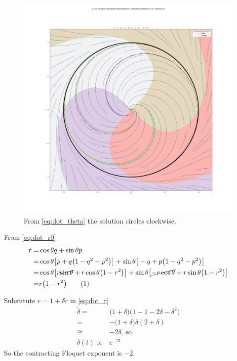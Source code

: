 \documentclass[]{article}
\newcommand\numberthis{\addtocounter{equation}{1}\tag{\theequation}}
\begin{document}
\begin{figure}[H]
	\caption{From \eqref{eq:dot_theta} the solution circles clockwise.}
	\includegraphics[width=\textwidth]{wk2/floquet.png}
\end{figure}
From \eqref{eq:dot_r0}
\begin{align*}
	\dot{r} =&	\cos{\theta} \dot{q} + \sin{\theta} \dot{p}\\
	=& 	\cos{\theta} \big[p + q\big(1-q^2-p^2\big)\big] + \sin{\theta} \big[-q + p\big(1-q^2-p^2\big)\big]\\
	=& 	\cos{\theta} \big[r \cancel{\sin{\theta}} + r \cos{\theta}\big(1-r^2\big)\big] + \sin{\theta} \big[\cancel{-r \cos{\theta}} + r \sin{\theta}\big(1-r^2\big)\big]\\
	=& r \big(1-r^2\big) \numberthis \label{eq:dot_r}
\end{align*}

Substitute $r=1+\delta r$ in \eqref{eq:dot_r}
\begin{align*}
	\dot{\delta} =& \big(1+\delta\big)\big(1 -1 -2 \delta - \delta^2\big)\\
	=& - \big(1+\delta\big) \delta (2 + \delta)\\
	\approxeq & - 2 \delta \text{, so}\\
	\delta(t) \propto & e^{-2 t}
\end{align*}
So the contracting Floquet exponent is $-2$.


\end{document}
